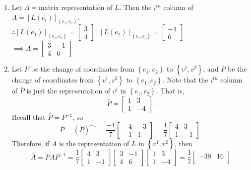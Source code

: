 \documentclass[11pt,twoside]{nsf_jwg} %
\begin{document}
\begin{enumerate}
\item Let $A=$matrix representation of $L$. Then the $i^{th}$ column
of $A=\left[L\left(e_{i}\right)\right]_{\left\{ e_{1},e_{2}\right\} }$.\\
$\therefore\left[L\left(e_{1}\right)\right]_{\left\{ e_{1},e_{2}\right\} }=\begin{bmatrix}3\\
4
\end{bmatrix},\,\left[L\left(e_{2}\right)\right]_{\left\{ e_{1},e_{2}\right\} }=\begin{bmatrix}-1\\
6
\end{bmatrix}$\\
$\implies A=\begin{bmatrix}3 & -1\\
4 & 6
\end{bmatrix}$
\item Let $P$ be the change of coordinates from $\left\{ e_{1},e_{2}\right\} $
to $\left\{ v^{1},v^{2}\right\} $, and $\bar{P}$ be the change of
coordinates from $\left\{ v^{1},v^{2}\right\} $ to $\left\{ e_{1},e_{2}\right\} $.
Note that the $i^{th}$ column of $\bar{P}$ is just the representation
of $v^{i}$ in $\left\{ e_{1},e_{2}\right\} $. That is,
\[\bar{P}=\begin{bmatrix}1 & 3\\
1 & -4
\end{bmatrix}.\]
Recall that $\bar{P}=P^{-1}$, so
\[P=\left(\bar{P}\right)^{-1}=\frac{-1}{7}\begin{bmatrix}-4 & -3\\
-1 & 1
\end{bmatrix}=\frac{1}{7}\begin{bmatrix}4 & 3\\
1 & -1
\end{bmatrix}.\]
Therefore, if $\bar{A}$ is the representation of $L$ in $\left\{ v^{1},v^{2}\right\} $,
then
\[\bar{A}=PAP^{-1}=\frac{1}{7}\begin{bmatrix}4 & 3\\
1 & -1
\end{bmatrix}\begin{bmatrix}3 & -1\\
4 & 6
\end{bmatrix}\begin{bmatrix}1 & 3\\
1 & -4
\end{bmatrix}=\frac{1}{7}\begin{bmatrix}-38 & 16\\

\end{bmatrix}\]
\end{enumerate}
\end{document}
